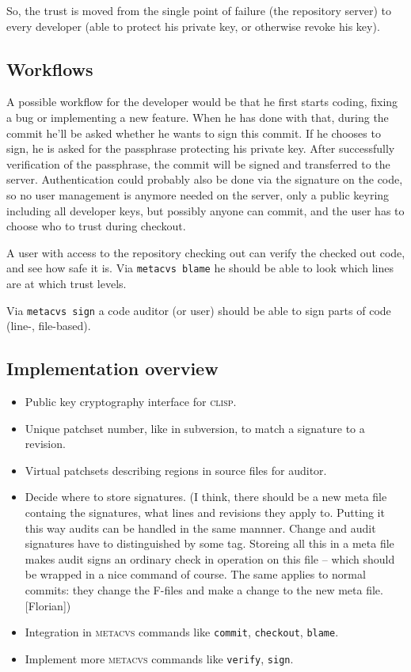\documentclass[german, 10pt, a4paper]{article}
\begin{document}
So, the trust is moved from the single point of failure (the repository
server) to every developer (able to protect his private key, or otherwise
revoke his key).

\subsection{Workflows}
A possible workflow for the developer would be that he first starts coding,
fixing a bug or implementing a new feature. When he has done with that,
during the commit he'll be asked whether he wants to sign this commit.
If he chooses to sign, he is asked for the passphrase protecting
his private key. After successfully verification of the passphrase,
the commit will be signed and transferred to the server.
Authentication could probably also be done via the signature on the code,
so no user management is anymore needed on the server, only a public keyring
including all developer keys, but possibly anyone can commit, and the user
has to choose who to trust during checkout.

A user with access to the repository checking out can verify the checked
out code, and see how safe it is.
Via \texttt{metacvs blame} he should be able to look which lines are
at which trust levels.

Via \texttt{metacvs sign} a code auditor (or user) should be able to
sign parts of code (line-, file-based).

\subsection{Implementation overview}
\begin{itemize}
\item Public key cryptography interface for \textsc{clisp}.
\item Unique patchset number, like in subversion, to match a signature to a revision.
\item Virtual patchsets describing regions in source files for auditor.
\item Decide where to store signatures.
(I think, there should be a new meta file containg the signatures, what
lines and revisions they apply to. Putting it this way audits can be handled
in the same mannner. Change and audit signatures have to distinguished by
some tag. Storeing all this in a meta file makes audit signs an
ordinary check in operation on this file -- which should be wrapped in
a nice command of course. The same applies to normal commits: they
change the F-files and make a change to the new meta file. [Florian])
\item Integration in \textsc{metacvs} commands like \texttt{commit},
\texttt{checkout}, \texttt{blame}.
\item Implement more \textsc{metacvs} commands like \texttt{verify},
\texttt{sign}.
\end{itemize}
\end{document}
